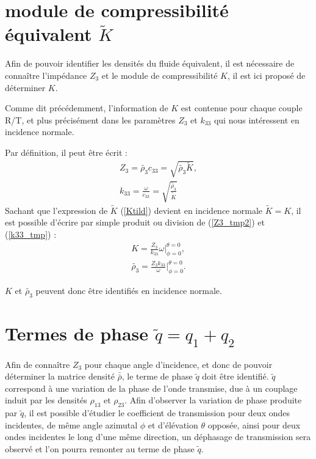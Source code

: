 \documentclass[twoside,openright]{report}
\begin{document}
\section{module de compressibilité équivalent $\tilde{K}$}
\label{Ch_Inv_S_K}
Afin de pouvoir identifier les densités du fluide équivalent, il est nécessaire de connaître l'impédance $Z_3$  et le module de compressibilité $K$, il est ici proposé de déterminer $K$.
    
    Comme dit précédemment, l'information de $K$ est contenue pour chaque couple R/T, et plus précisément dans les paramètres $Z_3$ et $k_{33}$ qui nous intéressent en incidence normale.
    
    Par définition, il peut être écrit :
    \begin{align}
        Z_3=\tilde{\rho_3}c_{33}=\sqrt{\tilde{\rho_3}\tilde{K}},\label{Z3_tmp2}\\
        k_{33}=\frac{\omega}{c_{33}}=\sqrt{\frac{\tilde{\rho_3}}{\tilde{K}}}\label{k33_tmp}
    \end{align}
    Sachant que l'expression de $\tilde{K}$ (\ref{Ktild}) devient en incidence normale $\tilde{K}=K$, il est possible d'écrire par simple produit ou division de (\ref{Z3_tmp2}) et (\ref{k33_tmp}) :
    \begin{align}
        K=\frac{Z_3}{k_{33}}\omega|^{\theta=0}_{\phi=0},\label{K}\\
        \tilde{\rho_3}=\frac{Z_3k_{33}}{\omega}|^{\theta=0}_{\phi=0}.\label{rho3tild_id}
    \end{align}
    
    $K$ et $\tilde{\rho_3}$ peuvent donc être identifiés en incidence normale.

\section{Termes de phase $\tilde{q}=q_1+q_2$}
\label{Ch_Inv_S_q}
    Afin de connaître $Z_3$ pour chaque angle d'incidence, et donc de pouvoir déterminer la matrice densité $\bar{\bar{\rho}}$, le terme de phase $\tilde{q}$ doit être identifié. $\tilde{q}$ correspond à une variation de la phase de l'onde transmise, due à un couplage induit par les densités $\rho_{13}$ et $\rho_{23}$. Afin d'observer la variation de phase produite par $\tilde{q}$, il est possible d'étudier le coefficient de transmission pour deux ondes incidentes, de même angle azimutal $\phi$ et d'élévation $\theta $ opposée, ainsi pour deux ondes incidentes le long d'une même direction, un déphasage de transmission sera observé et l'on pourra remonter au terme de phase $\tilde{q}$.
    
\end{document}
